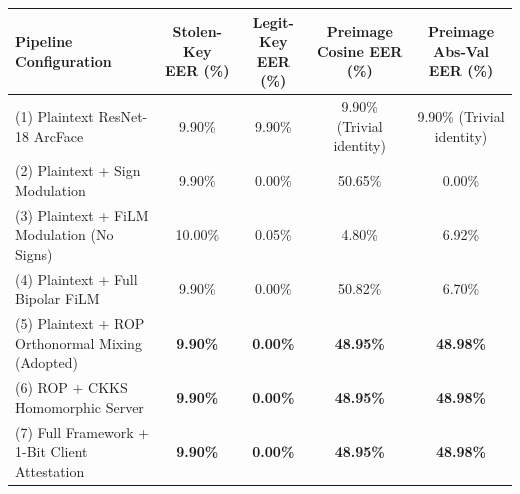 \begin{tabular}{lcccc}
\toprule
\textbf{Pipeline Configuration} & \textbf{Stolen-Key EER (\%)} & \textbf{Legit-Key EER (\%)} & \textbf{Preimage Cosine EER (\%)} & \textbf{Preimage Abs-Val EER (\%)} \\
\midrule
(1) Plaintext ResNet-18 ArcFace & 9.90\% & 9.90\% & 9.90\% (Trivial identity) & 9.90\% (Trivial identity) \\
(2) Plaintext + Sign Modulation & 9.90\% & 0.00\% & 50.65\% & 0.00\% \\
(3) Plaintext + FiLM Modulation (No Signs) & 10.00\% & 0.05\% & 4.80\% & 6.92\% \\
(4) Plaintext + Full Bipolar FiLM & 9.90\% & 0.00\% & 50.82\% & 6.70\% \\
(5) Plaintext + ROP Orthonormal Mixing (Adopted) & \textbf{9.90\%} & \textbf{0.00\%} & \textbf{48.95\%} & \textbf{48.98\%} \\
(6) ROP + CKKS Homomorphic Server & \textbf{9.90\%} & \textbf{0.00\%} & \textbf{48.95\%} & \textbf{48.98\%} \\
(7) Full Framework + 1-Bit Client Attestation & \textbf{9.90\%} & \textbf{0.00\%} & \textbf{48.95\%} & \textbf{48.98\%} \\
\bottomrule
\end{tabular}